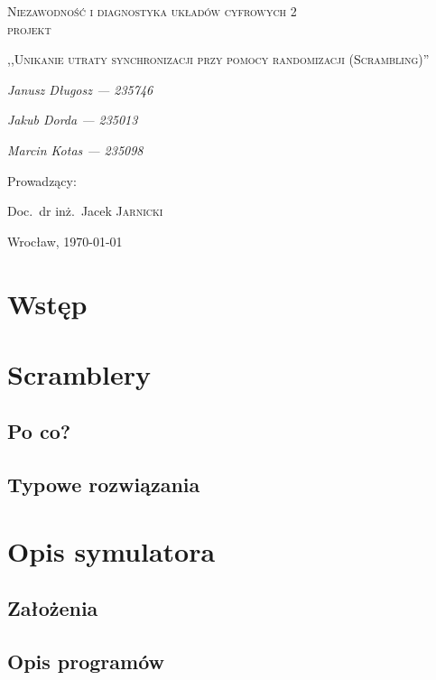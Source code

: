 \documentclass[polish, 11pt]{article}
\begin{document}
\begin{titlepage}
    \centering
    {\scshape\LARGE Niezawodność i diagnostyka układów cyfrowych 2\\ projekt \par}
    \vspace{1cm}
    {\scshape\Large,,Unikanie utraty synchronizacji przy pomocy randomizacji (Scrambling)''\par}
    \vspace{2cm}
    {\itshape\Large Janusz Długosz --- 235746\/\par}
    {\itshape\Large Jakub Dorda --- 235013\/\par}
    {\itshape\Large Marcin Kotas --- 235098\/\par}
    \vfill
    Prowadzący:\par
    Doc.~dr inż.~Jacek \textsc{Jarnicki}

    \vfill

    {\large Wrocław, \today\par}

\end{titlepage}

\section{Wstęp}

\section{Scramblery}
    \subsection{Po co?}

    \subsection{Typowe rozwiązania}

\section{Opis symulatora}
    \subsection{Założenia}

    \subsection{Opis programów}
\end{document}
